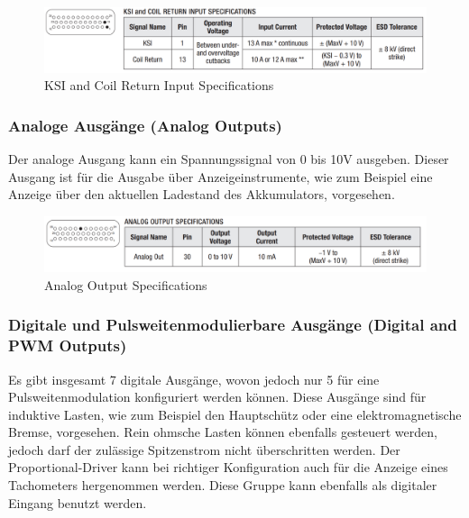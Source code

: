 \begin{figure}[H]
	\begin{center}
		\includegraphics[width=\textwidth]{figures/antrieb/KSI_CoilReturn_Input_Specifications.png}
		\caption{KSI and Coil Return Input Specifications}
	\end{center}
\end{figure}



\subsubsection{Analoge Ausgänge (Analog Outputs)}
Der analoge Ausgang kann ein Spannungssignal von 0 bis 10V ausgeben. Dieser Ausgang ist für die Ausgabe über Anzeigeinstrumente, wie zum Beispiel eine Anzeige über den aktuellen Ladestand des Akkumulators, vorgesehen.

\begin{figure}[H]
	\begin{center}
		\includegraphics[width=\textwidth]{figures/antrieb/Analog_Output_Specifications.png}
		\caption{Analog Output Specifications}
	\end{center}
\end{figure}


\newpage



\subsubsection{Digitale und Pulsweitenmodulierbare Ausgänge (Digital and PWM Outputs)}
Es gibt insgesamt 7 digitale Ausgänge, wovon jedoch nur 5 für eine Pulsweitenmodulation konfiguriert werden können. Diese Ausgänge sind für induktive Lasten, wie zum Beispiel den Hauptschütz oder eine elektromagnetische Bremse, vorgesehen. Rein ohmsche Lasten können ebenfalls gesteuert werden, jedoch darf der zulässige Spitzenstrom nicht überschritten werden. Der Proportional-Driver kann bei richtiger Konfiguration auch für die Anzeige eines Tachometers hergenommen werden. Diese Gruppe kann ebenfalls als digitaler Eingang benutzt werden.

